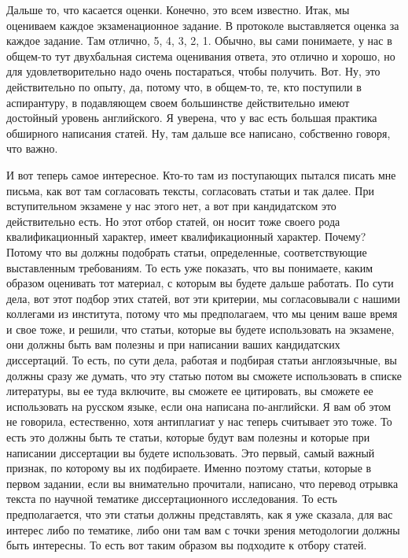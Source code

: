 \documentclass[main.tex]{subfiles}
\begin{document}
Дальше то, что касается оценки.
Конечно, это всем известно.
Итак, мы оцениваем каждое экзаменационное задание.
В протоколе выставляется оценка за каждое задание.
Там отлично, 5, 4, 3, 2, 1.
Обычно, вы сами понимаете, у нас в общем-то тут двухбальная система оценивания ответа, это отлично и хорошо, но для удовлетворительно надо очень постараться, чтобы получить.
Вот.
Ну, это действительно по опыту, да, потому что, в общем-то, те, кто поступили в аспирантуру, в подавляющем своем большинстве действительно имеют достойный уровень английского.
Я уверена, что у вас есть большая практика обширного написания статей.
Ну, там дальше все написано, собственно говоря, что важно.

И вот теперь самое интересное.
Кто-то там из поступающих пытался писать мне письма, как вот там согласовать тексты, согласовать статьи и так далее.
При вступительном экзамене у нас этого нет, а вот при кандидатском это действительно есть.
Но этот отбор статей, он носит тоже своего рода квалификационный характер, имеет квалификационный характер.
Почему? Потому что вы должны подобрать статьи, определенные, соответствующие выставленным требованиям.
То есть уже показать, что вы понимаете, каким образом оценивать тот материал, с которым вы будете дальше работать.
По сути дела, вот этот подбор этих статей, вот эти критерии, мы согласовывали с нашими коллегами из института, потому что мы предполагаем, что мы ценим ваше время и свое тоже, и решили, что статьи, которые вы будете использовать на экзамене, они должны быть вам полезны и при написании ваших кандидатских диссертаций.
То есть, по сути дела, работая и подбирая статьи англоязычные, вы должны сразу же думать, что эту статью потом вы сможете использовать в списке литературы, вы ее туда включите, вы сможете ее цитировать, вы сможете ее использовать на русском языке, если она написана по-английски.
Я вам об этом не говорила, естественно, хотя антиплагиат у нас теперь считывает это тоже.
То есть это должны быть те статьи, которые будут вам полезны и которые при написании диссертации вы будете использовать.
Это первый, самый важный признак, по которому вы их подбираете.
Именно поэтому статьи, которые в первом задании, если вы внимательно прочитали, написано, что перевод отрывка текста по научной тематике диссертационного исследования.
То есть предполагается, что эти статьи должны представлять, как я уже сказала, для вас интерес либо по тематике, либо они там вам с точки зрения методологии должны быть интересны.
То есть вот таким образом вы подходите к отбору статей.
\end{document}
